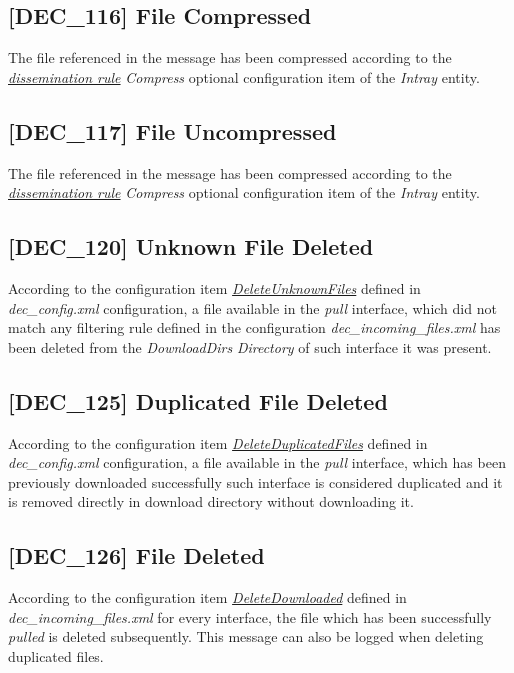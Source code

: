 \documentclass[dec_sum_main.tex]{subfiles}
\begin{document}
\label{DEC116}
\subsection{[DEC\_116] File Compressed}
The file referenced in the message has been compressed according to the \hyperref[Dissemination rules]{\textit{dissemination rule}} \textit{Compress} optional configuration item of the \textit{Intray} entity.

\label{DEC117}
\subsection{[DEC\_117] File Uncompressed}
The file referenced in the message has been compressed according to the \hyperref[Dissemination rules]{\textit{dissemination rule}} \textit{Compress} optional configuration item of the \textit{Intray} entity.

\subsection{[DEC\_120] Unknown File Deleted}
According to the configuration item \hyperref[DeleteUnknownFiles]{\textit{DeleteUnknownFiles}} defined in \textit{dec\_config.xml} configuration, a file available in the \textit{pull} interface, which did not match any filtering rule defined in the configuration \textit{dec\_incoming\_files.xml} has been deleted from the \textit{DownloadDirs} \textit{Directory} of such interface it was present.

\label{DEC125}
\subsection{[DEC\_125] Duplicated File Deleted}
According to the configuration item \hyperref[DeleteDuplicatedFiles]{\textit{DeleteDuplicatedFiles}} defined in \textit{dec\_config.xml} configuration, a file available in the \textit{pull} interface, which has been previously downloaded successfully such interface is considered duplicated and it is removed directly in download directory without downloading it.

\label{DEC126}
\subsection{[DEC\_126] File Deleted}
According to the configuration item \hyperref[DeleteFlag]{\textit{DeleteDownloaded}} defined in \textit{dec\_incoming\_files.xml} for every interface, the file which has been successfully \textit{pulled} is deleted subsequently.
This message can also be logged when deleting duplicated files.
\end{document}
